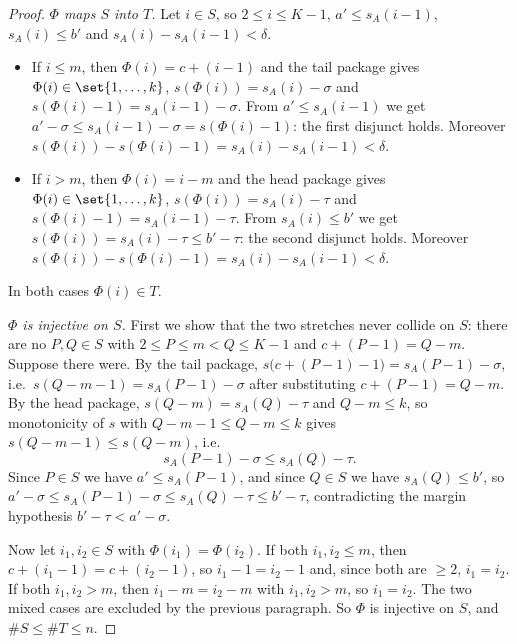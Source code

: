 \begin{proof}
  \emph{$\Phi$ maps $S$ into $T$.} Let $i \in S$, so $2 \le i \le K-1$, $a' \le s_A(i-1)$,
  $s_A(i) \le b'$ and $s_A(i)-s_A(i-1)<\delta$.
  \begin{itemize}
    \item If $i \le m$, then $\Phi(i) = c+(i-1)$ and the tail package gives
      $\Phi(i) \in \set{1,\dots,k}$, $s(\Phi(i)) = s_A(i)-\sigma$ and
      $s(\Phi(i)-1) = s_A(i-1)-\sigma$. From $a' \le s_A(i-1)$ we get
      $a'-\sigma \le s_A(i-1)-\sigma = s(\Phi(i)-1)$: the first disjunct holds. Moreover
      $s(\Phi(i))-s(\Phi(i)-1) = s_A(i)-s_A(i-1) < \delta$.
    \item If $i > m$, then $\Phi(i) = i-m$ and the head package gives
      $\Phi(i)\in\set{1,\dots,k}$, $s(\Phi(i)) = s_A(i)-\tau$ and
      $s(\Phi(i)-1) = s_A(i-1)-\tau$. From $s_A(i) \le b'$ we get
      $s(\Phi(i)) = s_A(i)-\tau \le b'-\tau$: the second disjunct holds. Moreover
      $s(\Phi(i))-s(\Phi(i)-1) = s_A(i)-s_A(i-1) < \delta$.
  \end{itemize}
  In both cases $\Phi(i) \in T$.

  \emph{$\Phi$ is injective on $S$.} First we show that the two stretches never collide on $S$:
  there are no $P,Q \in S$ with $2 \le P \le m < Q \le K-1$ and $c+(P-1) = Q-m$. Suppose there
  were. By the tail package, $s\bigl(c+(P-1)-1\bigr) = s_A(P-1)-\sigma$, i.e.\
  $s(Q-m-1) = s_A(P-1)-\sigma$ after substituting $c+(P-1)=Q-m$. By the head package,
  $s(Q-m) = s_A(Q)-\tau$ and $Q-m\le k$, so monotonicity of $s$ with $Q-m-1 \le Q-m \le k$ gives
  $s(Q-m-1)\le s(Q-m)$, i.e.
  \[
    s_A(P-1)-\sigma \le s_A(Q)-\tau .
  \]
  Since $P \in S$ we have $a' \le s_A(P-1)$, and since $Q \in S$ we have $s_A(Q) \le b'$, so
  $a'-\sigma \le s_A(P-1)-\sigma \le s_A(Q)-\tau \le b'-\tau$, contradicting the margin hypothesis
  $b'-\tau<a'-\sigma$.

  Now let $i_1,i_2 \in S$ with $\Phi(i_1)=\Phi(i_2)$. If both $i_1,i_2 \le m$, then
  $c+(i_1-1)=c+(i_2-1)$, so $i_1-1=i_2-1$ and, since both are $\ge 2$, $i_1=i_2$. If both
  $i_1,i_2 > m$, then $i_1-m = i_2-m$ with $i_1,i_2>m$, so $i_1=i_2$. The two mixed cases are
  excluded by the previous paragraph. So $\Phi$ is injective on $S$, and
  $\#S \le \#T \le n$.
\end{proof}
